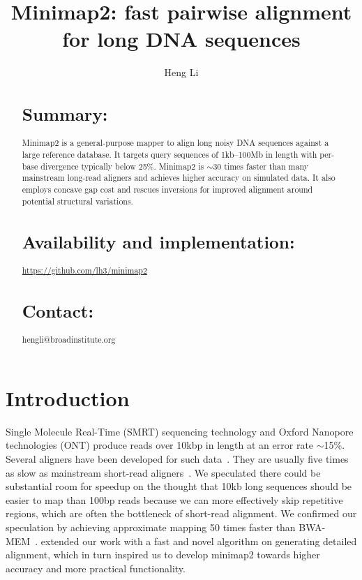 \documentclass{bioinfo}
\begin{document}

\title[Long DNA sequence alignment with minimap2]{Minimap2: fast pairwise alignment for long DNA sequences}
\author[Li]{Heng Li}
\address{Broad Institute, 415 Main Street, Cambridge, MA 02142, USA}

\maketitle

\begin{abstract}
\section{Summary:} Minimap2 is a general-purpose mapper to align long noisy DNA
sequences against a large reference database. It targets query sequences of
1kb--100Mb in length with per-base divergence typically below 25\%. Minimap2 is
$\sim$30 times faster than many mainstream long-read aligners and achieves
higher accuracy on simulated data. It also employs concave gap cost and rescues
inversions for improved alignment around potential structural variations.

\section{Availability and implementation:}
\href{https://github.com/lh3/minimap2}{https://github.com/lh3/minimap2}

\section{Contact:} hengli@broadinstitute.org
\end{abstract}

\section{Introduction}

Single Molecule Real-Time (SMRT) sequencing technology and Oxford Nanopore
technologies (ONT) produce reads over 10kbp in length at an error rate
$\sim$15\%. Several aligners have been developed for such
data~\citep{Chaisson:2012aa,Li:2013aa,Liu:2016ab,Sovic:2016aa,Liu:2017aa,Lin:2017aa,Sedlazeck169557}.
They are usually five times as slow as mainstream short-read
aligners~\citep{Langmead:2012fk,Li:2013aa}. We speculated there could be
substantial room for speedup on the thought that 10kb long sequences should be
easier to map than 100bp reads because we can more effectively skip repetitive
regions, which are often the bottleneck of short-read alignment. We confirmed
our speculation by achieving approximate mapping 50 times faster than
BWA-MEM~\citep{Li:2016aa}.  \citet{Suzuki:2016} extended our work with a fast
and novel algorithm on generating detailed alignment, which in turn inspired us
to develop minimap2 towards higher accuracy and more practical functionality.
\end{document}
